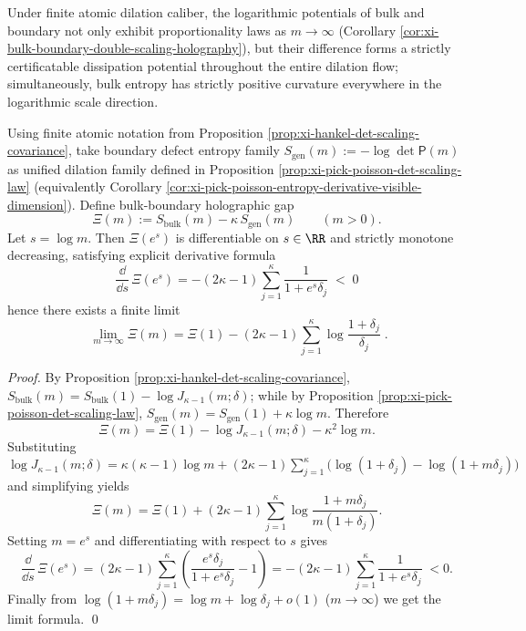 
Under finite atomic dilation caliber, the logarithmic potentials of bulk and boundary not only exhibit proportionality laws as \(m\to\infty\) (Corollary \ref{cor:xi-bulk-boundary-double-scaling-holography}),
but their difference forms a strictly certificatable dissipation potential throughout the entire dilation flow; simultaneously, bulk entropy has strictly positive curvature everywhere in the logarithmic scale direction.

\begin{corollary}\label{cor:xi-bulk-boundary-holographic-gap-dissipation}
Using finite atomic notation from Proposition \ref{prop:xi-hankel-det-scaling-covariance}, take boundary defect entropy family
\(
S_{\mathrm{gen}}(m):=-\log\det\mathsf P(m)
\)
as unified dilation family defined in Proposition \ref{prop:xi-pick-poisson-det-scaling-law} (equivalently Corollary \ref{cor:xi-pick-poisson-entropy-derivative-visible-dimension}).
Define bulk-boundary holographic gap
\[
\Xi(m):=S_{\mathrm{bulk}}(m)-\kappa\,S_{\mathrm{gen}}(m)\qquad(m>0).
\]
Let \(s=\log m\).
Then \(\Xi(e^s)\) is differentiable on \(s\in\RR\) and strictly monotone decreasing, satisfying explicit derivative formula
\[
\boxed{\;
\frac{\dd}{\dd s}\,\Xi(e^s)
=-(2\kappa-1)\sum_{j=1}^{\kappa}\frac{1}{1+e^s\delta_j}\;<\;0\;}
\]
hence there exists a finite limit
\[
\boxed{\;
\lim_{m\to\infty}\Xi(m)
=\Xi(1)-(2\kappa-1)\sum_{j=1}^{\kappa}\log\frac{1+\delta_j}{\delta_j}\; }.
\]
\end{corollary}
\begin{proof}
By Proposition \ref{prop:xi-hankel-det-scaling-covariance},
\(
S_{\mathrm{bulk}}(m)=S_{\mathrm{bulk}}(1)-\log J_{\kappa-1}(m;\delta)
\);
while by Proposition \ref{prop:xi-pick-poisson-det-scaling-law},
\(
S_{\mathrm{gen}}(m)=S_{\mathrm{gen}}(1)+\kappa\log m
\).
Therefore
\[
\Xi(m)
=\Xi(1)-\log J_{\kappa-1}(m;\delta)-\kappa^2\log m.
\]
Substituting
\(
\log J_{\kappa-1}(m;\delta)
=\kappa(\kappa-1)\log m+(2\kappa-1)\sum_{j=1}^{\kappa}\bigl(\log(1+\delta_j)-\log(1+m\delta_j)\bigr)
\)
and simplifying yields
\[
\Xi(m)=\Xi(1)+(2\kappa-1)\sum_{j=1}^{\kappa}\log\frac{1+m\delta_j}{m(1+\delta_j)}.
\]
Setting \(m=e^s\) and differentiating with respect to \(s\) gives
\[
\frac{\dd}{\dd s}\,\Xi(e^s)
=(2\kappa-1)\sum_{j=1}^{\kappa}\left(\frac{e^s\delta_j}{1+e^s\delta_j}-1\right)
=-(2\kappa-1)\sum_{j=1}^{\kappa}\frac{1}{1+e^s\delta_j}\;<0.
\]
Finally from \(\log(1+m\delta_j)=\log m+\log\delta_j+o(1)\) (\(m\to\infty\)) we get the limit formula. \qed
\end{proof}

